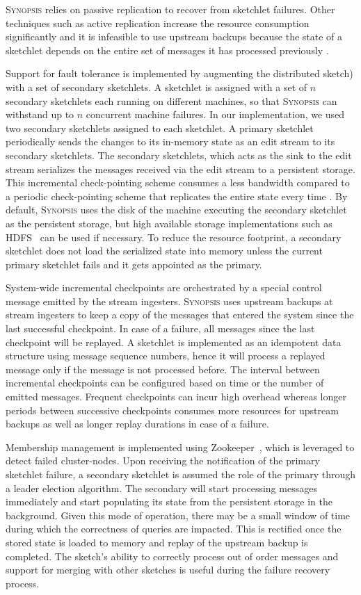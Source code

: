 \textsc{Synopsis} relies on passive replication to recover from sketchlet failures.
Other techniques such as active replication increase the resource consumption significantly and it is infeasible to use upstream backups because the state of a sketchlet depends on the entire set of messages it has processed previously \cite{castro2013integrating}.

Support for fault tolerance is implemented by augmenting the distributed sketch) with a set of secondary sketchlets.
A sketchlet is assigned with a set of $n$ secondary sketchlets each running on different machines, so that \textsc{Synopsis} can withstand up to $n$ concurrent machine failures.
In our implementation, we used two secondary sketchlets assigned to each sketchlet.
A primary sketchlet periodically sends the changes to its in-memory state as an edit stream to its secondary sketchlets.
The secondary sketchlets, which acts as the sink to the edit stream serializes the messages received via the edit stream to a persistent storage.
This incremental check-pointing scheme consumes a less bandwidth compared to a periodic check-pointing scheme that replicates the entire state every time \cite{castro2013integrating}.
By default, \textsc{Synopsis} uses the disk of the machine executing the secondary sketchlet as the persistent storage, but high available storage implementations such as HDFS~\cite{borthakur2008hdfs} can be used if necessary.
To reduce the resource footprint, a secondary sketchlet does not load the serialized state into memory unless the current primary sketchlet fails and it gets appointed as the primary.

System-wide incremental checkpoints are orchestrated by a special control message emitted by the stream ingesters.
\textsc{Synopsis} uses upstream backups at stream ingesters to keep a copy of the messages that entered the system since the last successful checkpoint.
In case of a failure, all messages since the last checkpoint will be replayed.
A sketchlet is implemented as an idempotent data structure using message sequence numbers, hence it will process a replayed message only if the message is not processed before.
The interval between incremental checkpoints can be configured based on time or the number of emitted messages.
Frequent checkpoints can incur high overhead whereas longer periods between successive checkpoints consumes more resources for upstream backups as well as longer replay durations in case of a failure.

Membership management is implemented using Zookeeper~\cite{hunt2010zookeeper}, which is leveraged to detect failed cluster-nodes.
Upon receiving the notification of the primary sketchlet failure, a secondary sketchlet is assumed the role of the primary through a leader election algorithm.
The secondary will start processing messages immediately and start populating its state from the persistent storage in the background.
Given this mode of operation, there may be a small window of time during which the correctness of queries are impacted.
This is rectified once the stored state is loaded to memory and replay of the upstream backup is completed.
The sketch's ability to correctly process out of order messages and support for merging with other sketches is useful during the failure recovery process.


